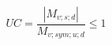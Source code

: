 \documentclass[12pt]{article}
\begin{document}
\begin{displaymath}
UC = \frac {|M_{v;s;d}|} {M_{v;sym;u;d}} \leq 1
\end{displaymath}
\end{document}

